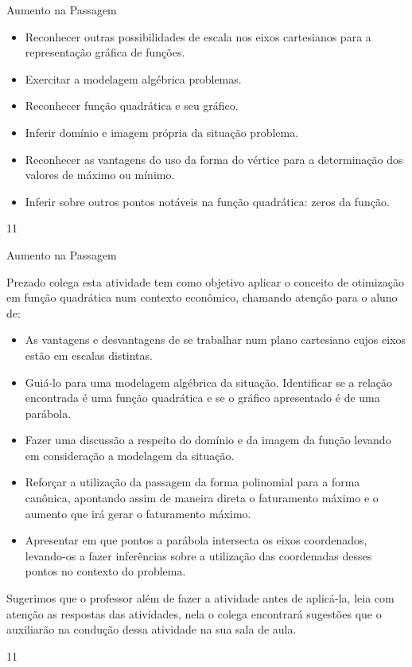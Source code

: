 \cleardoublepage
\def\currentcolor{session1}
\begin{objectives}{Aumento na Passagem}
{
\begin{itemize}
\item Reconhecer outras possibilidades de escala nos eixos
cartesianos para a representação gráfica de funções.
\item Exercitar a modelagem algébrica problemas.
\item Reconhecer função quadrática e seu gráfico.
\item Inferir domínio e imagem própria da situação problema.
\item Reconhecer as vantagens do uso da forma do vértice para a determinação dos valores de máximo ou mínimo.
\item Inferir sobre outros pontos notáveis na função quadrática: zeros da função.
\end{itemize}
}{1}{1}
\end{objectives}
\marginpar{\vspace{-2.25em}}
\begin{sugestions}{Aumento na Passagem}
{
Prezado colega esta atividade tem como objetivo aplicar o conceito de otimização em função quadrática num contexto econômico, chamando atenção para o aluno de:

\begin{itemize}
\item As vantagens e desvantagens de se trabalhar num plano cartesiano cujos eixos estão em escalas distintas.
\item Guiá-lo para uma modelagem algébrica da situação.
Identificar se a relação encontrada é uma função quadrática e se o gráfico apresentado é de uma parábola.
\item Fazer uma discussão a respeito do domínio e da imagem da função levando em consideração a modelagem da situação.
\item Reforçar a utilização da passagem da forma polinomial para a forma canônica, apontando assim de maneira direta o faturamento máximo e o aumento que irá gerar o faturamento máximo.
\item Apresentar em que pontos a parábola intersecta os eixos coordenados, levando-os a fazer inferências sobre a utilização das coordenadas desses pontos no contexto do problema.
\end{itemize}

Sugerimos que o professor além de fazer a atividade antes de aplicá-la, leia com atenção as respostas das atividades, nela o colega encontrará sugestões que o auxiliarão na condução dessa atividade na sua sala de aula.
}{1}{1}
\end{sugestions}
